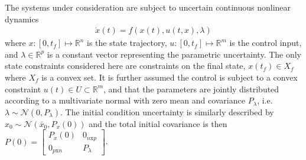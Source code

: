 \documentclass[10pt,a4paper]{article}
\begin{document}
	The systems under consideration are subject to uncertain continuous nonlinear dynamics 
	\begin{align}
	\dot{x}(t) = f(x(t),u(t,x),\lambda) \label{eq_dynamics}
	\end{align}
	where $x:[0,t_f]\mapsto \mathbb{R}^n$ is the state trajectory, $u:[0,t_f]\mapsto \mathbb{R}^m$ is the control input, and $\lambda\in\mathbb{R}^p$ is a constant vector representing the parametric uncertainty. The only state constraints considered here are constraints on the final state, $x(t_f)\in X_f$ where $X_f$ is a convex set. It is further assumed the control is subject to a convex constraint $u(t) \in U \subset \mathbb{R}^m$, and that the parameters are jointly distributed according to a multivariate normal with zero mean and covariance $P_{\lambda}$, i.e. $\lambda \sim \mathcal{N}(0,P_{\lambda})$. The initial condition uncertainty is similarly described by $x_0 \sim \mathcal{N}(\bar{x}_0,P_x(0))$ and the total initial covariance is then $P(0) = \left[\begin{array}{cc}
		P_{x}(0)& 0_{n\mathrm{x}p} \\
		 0_{p\mathrm{x}n} & P_{\lambda}
		\end{array}\right]$.
	
\end{document}
